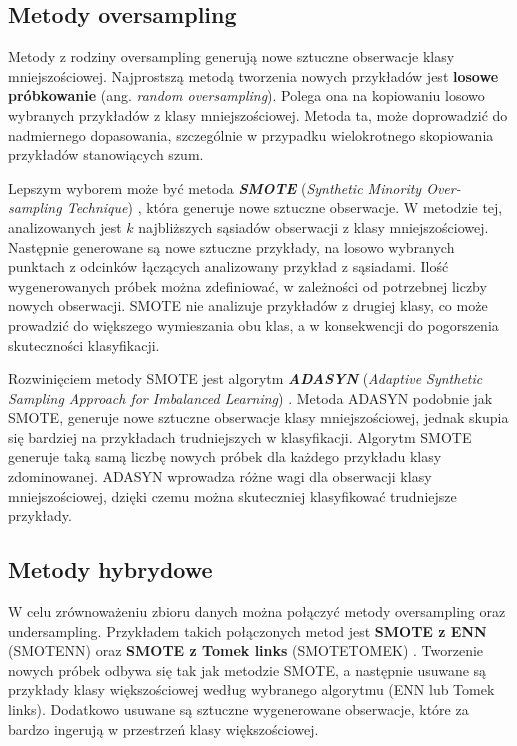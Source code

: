 \subsection{Metody oversampling}
Metody z rodziny oversampling generują nowe sztuczne obserwacje klasy mniejszościowej. Najprostszą metodą tworzenia nowych przykładów jest \textbf{losowe próbkowanie} (ang. \textit{random oversampling}). Polega ona na kopiowaniu losowo wybranych przykładów z klasy mniejszościowej. Metoda ta, może doprowadzić do nadmiernego dopasowania, szczególnie w przypadku wielokrotnego skopiowania przykładów stanowiących szum. \par
Lepszym wyborem może być metoda \textbf{\textit{SMOTE}} (\textit{Synthetic Minority Over-sampling Technique}) \cite{smotec}, która generuje nowe sztuczne obserwacje. W metodzie tej, analizowanych jest $k$ najbliższych sąsiadów obserwacji z klasy mniejszościowej. Następnie generowane są nowe sztuczne przykłady, na losowo wybranych punktach z odcinków łączących analizowany przykład z sąsiadami. Ilość wygenerowanych próbek można zdefiniować, w zależności od potrzebnej liczby nowych obserwacji. SMOTE nie analizuje przykładów z drugiej klasy, co może prowadzić do większego wymieszania obu klas, a w konsekwencji do pogorszenia skuteczności klasyfikacji. \par
Rozwinięciem metody SMOTE jest algorytm \textbf{\textit{ADASYN}} (\textit{Adaptive Synthetic Sampling Approach for Imbalanced Learning}) \cite{adasync}. Metoda ADASYN podobnie jak SMOTE, generuje nowe sztuczne obserwacje klasy mniejszościowej, jednak skupia się bardziej na przykładach trudniejszych w klasyfikacji. Algorytm SMOTE generuje taką samą liczbę nowych próbek dla każdego przykładu klasy zdominowanej. ADASYN wprowadza różne wagi dla obserwacji klasy mniejszościowej, dzięki czemu można skuteczniej klasyfikować trudniejsze przykłady.
\subsection{Metody hybrydowe}
W celu zrównoważeniu zbioru danych można połączyć metody oversampling oraz undersampling. Przykładem takich połączonych metod jest \textbf{SMOTE z ENN} (SMOTENN) oraz \textbf{SMOTE z Tomek links} (SMOTETOMEK) \cite{hybrid}. Tworzenie nowych próbek odbywa się tak jak metodzie SMOTE, a następnie usuwane są przykłady klasy większościowej według wybranego algorytmu (ENN lub Tomek links). Dodatkowo usuwane są sztuczne wygenerowane obserwacje, które za bardzo ingerują w przestrzeń klasy większościowej.
